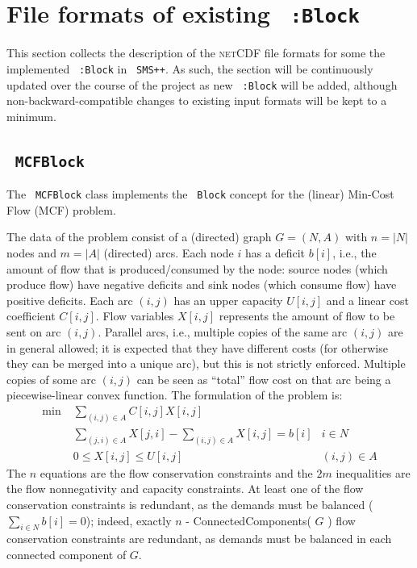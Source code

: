 \documentclass[a4paper]{article}
\def\netCDF{\textsc{netCDF}\xspace}
\newcommand{\code}[1]{\textrm{\texttt{\hyphenchar\font=200 #1}}}
\def\SMSpp{\code{SMS++}\xspace}
\def\Block{\code{Block}\xspace}
\def\dBlock{\code{:Block}\xspace}
\begin{document}

\section{File formats of existing \dBlock}

This section collects the description of the \netCDF file formats for some the implemented \dBlock in \SMSpp. As such, the section will be continuously updated over the course of the project as new \dBlock will be added, although non-backward-compatible changes to existing input formats will be kept to a minimum.

\subsection {\code{MCFBlock}}

The \code{MCFBlock} class implements the \Block concept for the (linear) Min-Cost Flow (MCF) problem.

\smallskip
\noindent
The data of the problem consist of a (directed) graph $G = ( N , A )$ with $n = |N|$ nodes and $m = |A|$ (directed) arcs. Each node $i$ has a deficit $b[ i ]$, i.e., the amount of flow that is produced/consumed by the node: source nodes (which produce flow) have negative deficits and sink nodes (which consume flow) have positive deficits. Each arc $(i, j)$ has an upper capacity $U[ i , j ]$ and a linear cost coefficient $C[ i , j ]$. Flow variables $X[ i , j ]$ represents the amount of flow to be sent on arc $(i, j)$. Parallel arcs, i.e., multiple copies of the same arc $(i, j)$ are in general allowed; it is expected that they have different costs (for otherwise they can be merged into a unique arc), but this is not strictly enforced. Multiple copies of some arc $(i, j)$ can be seen as ``total'' flow cost on that arc being a piecewise-linear convex function. The formulation of the problem is:
%
\begin{align*}
 \min \; & \textstyle \sum_{ (i, j) \in A } C[ i , j ] X[ i, j ] \\[0.1cm]
 & \textstyle
   \sum_{ (j, i) \in A } X[ j , i ] -
   \sum_{ (i, j) \in A } X[ i , j ] = b[ i ] & i \in N \\[0.1cm]
 & 0 \leq X[ i , j ] \leq U[ i , j ] & (i, j) \in A
\end{align*}
%
The $n$ equations are the flow conservation constraints and the $2m$ inequalities are the flow nonnegativity and capacity constraints. At least one of the flow conservation constraints is redundant, as the demands must be balanced ($\sum_{ i \in N } b[ i ] = 0$); indeed, exactly $n$ - ConnectedComponents( $G$ ) flow conservation constraints are redundant, as demands must be balanced in each connected component of $G$.
\end{document}
